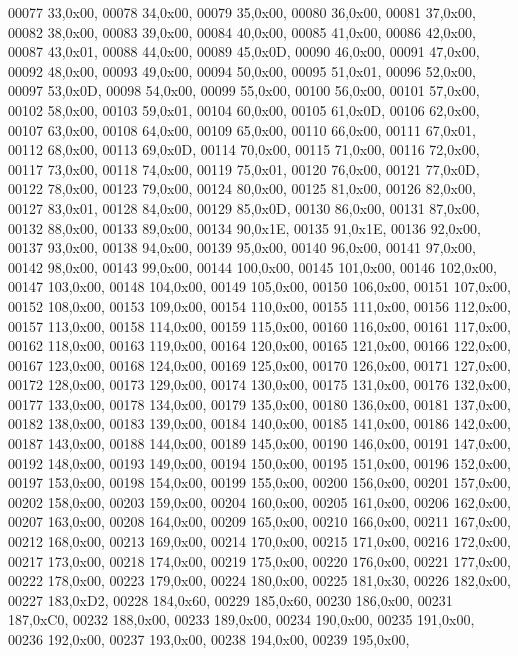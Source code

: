 \begin{DoxyCode}
00077  33,0x00,
00078  34,0x00,
00079  35,0x00,
00080  36,0x00,
00081  37,0x00,
00082  38,0x00,
00083  39,0x00,
00084  40,0x00,
00085  41,0x00,
00086  42,0x00,
00087  43,0x01,
00088  44,0x00,
00089  45,0x0D,
00090  46,0x00,
00091  47,0x00,
00092  48,0x00,
00093  49,0x00,
00094  50,0x00,
00095  51,0x01,
00096  52,0x00,
00097  53,0x0D,
00098  54,0x00,
00099  55,0x00,
00100  56,0x00,
00101  57,0x00,
00102  58,0x00,
00103  59,0x01,
00104  60,0x00,
00105  61,0x0D,
00106  62,0x00,
00107  63,0x00,
00108  64,0x00,
00109  65,0x00,
00110  66,0x00,
00111  67,0x01,
00112  68,0x00,
00113  69,0x0D,
00114  70,0x00,
00115  71,0x00,
00116  72,0x00,
00117  73,0x00,
00118  74,0x00,
00119  75,0x01,
00120  76,0x00,
00121  77,0x0D,
00122  78,0x00,
00123  79,0x00,
00124  80,0x00,
00125  81,0x00,
00126  82,0x00,
00127  83,0x01,
00128  84,0x00,
00129  85,0x0D,
00130  86,0x00,
00131  87,0x00,
00132  88,0x00,
00133  89,0x00,
00134  90,0x1E,
00135  91,0x1E,
00136  92,0x00,
00137  93,0x00,
00138  94,0x00,
00139  95,0x00,
00140  96,0x00,
00141  97,0x00,
00142  98,0x00,
00143  99,0x00,
00144 100,0x00,
00145 101,0x00,
00146 102,0x00,
00147 103,0x00,
00148 104,0x00,
00149 105,0x00,
00150 106,0x00,
00151 107,0x00,
00152 108,0x00,
00153 109,0x00,
00154 110,0x00,
00155 111,0x00,
00156 112,0x00,
00157 113,0x00,
00158 114,0x00,
00159 115,0x00,
00160 116,0x00,
00161 117,0x00,
00162 118,0x00,
00163 119,0x00,
00164 120,0x00,
00165 121,0x00,
00166 122,0x00,
00167 123,0x00,
00168 124,0x00,
00169 125,0x00,
00170 126,0x00,
00171 127,0x00,
00172 128,0x00,
00173 129,0x00,
00174 130,0x00,
00175 131,0x00,
00176 132,0x00,
00177 133,0x00,
00178 134,0x00,
00179 135,0x00,
00180 136,0x00,
00181 137,0x00,
00182 138,0x00,
00183 139,0x00,
00184 140,0x00,
00185 141,0x00,
00186 142,0x00,
00187 143,0x00,
00188 144,0x00,
00189 145,0x00,
00190 146,0x00,
00191 147,0x00,
00192 148,0x00,
00193 149,0x00,
00194 150,0x00,
00195 151,0x00,
00196 152,0x00,
00197 153,0x00,
00198 154,0x00,
00199 155,0x00,
00200 156,0x00,
00201 157,0x00,
00202 158,0x00,
00203 159,0x00,
00204 160,0x00,
00205 161,0x00,
00206 162,0x00,
00207 163,0x00,
00208 164,0x00,
00209 165,0x00,
00210 166,0x00,
00211 167,0x00,
00212 168,0x00,
00213 169,0x00,
00214 170,0x00,
00215 171,0x00,
00216 172,0x00,
00217 173,0x00,
00218 174,0x00,
00219 175,0x00,
00220 176,0x00,
00221 177,0x00,
00222 178,0x00,
00223 179,0x00,
00224 180,0x00,
00225 181,0x30,
00226 182,0x00,
00227 183,0xD2,
00228 184,0x60,
00229 185,0x60,
00230 186,0x00,
00231 187,0xC0,
00232 188,0x00,
00233 189,0x00,
00234 190,0x00,
00235 191,0x00,
00236 192,0x00,
00237 193,0x00,
00238 194,0x00,
00239 195,0x00,

\end{DoxyCode}
